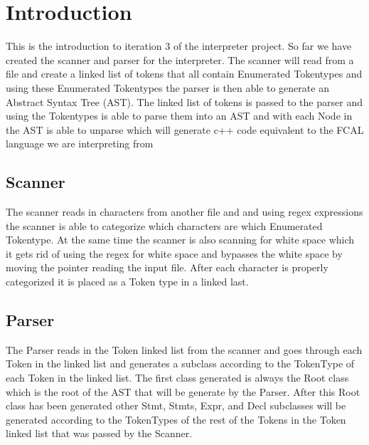 \hypertarget{index_intro_sec}{}\section{Introduction}\label{index_intro_sec}
This is the introduction to iteration 3 of the interpreter project. So far we have created the scanner and parser for the interpreter. The scanner will read from a file and create a linked list of tokens that all contain Enumerated Tokentypes and using these Enumerated Tokentypes the parser is then able to generate an Abstract Syntax Tree (A\+ST). The linked list of tokens is passed to the parser and using the Tokentypes is able to parse them into an A\+ST and with each Node in the A\+ST is able to unparse which will generate c++ code equivalent to the F\+C\+AL language we are interpreting from\hypertarget{index_Scanner}{}\subsection{Scanner}\label{index_Scanner}
The scanner reads in characters from another file and and using regex expressions the scanner is able to categorize which characters are which Enumerated Tokentype. At the same time the scanner is also scanning for white space which it gets rid of using the regex for white space and bypasses the white space by moving the pointer reading the input file. After each character is properly categorized it is placed as a Token type in a linked last.\hypertarget{index_Parser}{}\subsection{Parser}\label{index_Parser}
The Parser reads in the Token linked list from the scanner and goes through each Token in the linked list and generates a subclass according to the Token\+Type of each Token in the linked list. The first class generated is always the Root class which is the root of the A\+ST that will be generate by the Parser. After this Root class has been generated other Stmt, Stmts, Expr, and Decl subclasses will be generated according to the Token\+Types of the rest of the Tokens in the Token linked list that was passed by the Scanner. 
